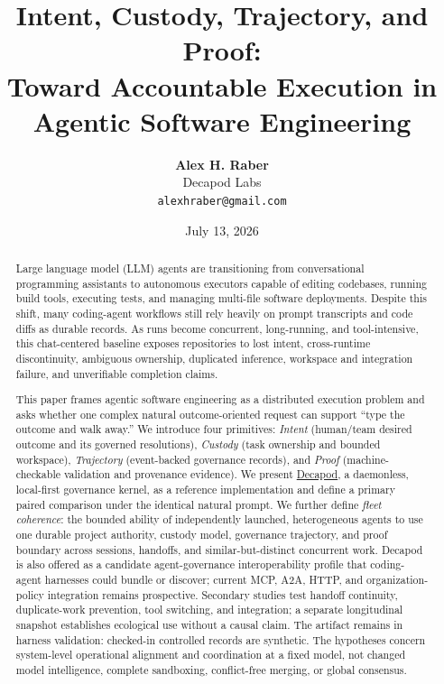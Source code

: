 \documentclass[11pt,a4paper]{article}
\title{\Huge\sffamily\bfseries Intent, Custody, Trajectory, and Proof:\\\Large Toward Accountable Execution in Agentic Software Engineering}
\author{\textbf{Alex H. Raber}\\[0.5em]
\sffamily Decapod Labs\\[0.2em]
\texttt{alexhraber@gmail.com}
}
\date{\sffamily July 13, 2026}
\begin{document}
\maketitle

\begin{abstract}
\noindent Large language model (LLM) agents are transitioning from conversational programming assistants to autonomous executors capable of editing codebases, running build tools, executing tests, and managing multi-file software deployments. Despite this shift, many coding-agent workflows still rely heavily on prompt transcripts and code diffs as durable records. As runs become concurrent, long-running, and tool-intensive, this chat-centered baseline exposes repositories to lost intent, cross-runtime discontinuity, ambiguous ownership, duplicated inference, workspace and integration failure, and unverifiable completion claims.

\medskip
\noindent This paper frames agentic software engineering as a distributed execution problem and asks whether one complex natural outcome-oriented request can support ``type the outcome and walk away.'' We introduce four primitives: \emph{Intent} (human/team desired outcome and its governed resolutions), \emph{Custody} (task ownership and bounded workspace), \emph{Trajectory} (event-backed governance records), and \emph{Proof} (machine-checkable validation and provenance evidence). We present \href{https://github.com/DecapodLabs/decapod}{Decapod}, a daemonless, local-first governance kernel, as a reference implementation and define a primary paired comparison under the identical natural prompt. We further define \emph{fleet coherence}: the bounded ability of independently launched, heterogeneous agents to use one durable project authority, custody model, governance trajectory, and proof boundary across sessions, handoffs, and similar-but-distinct concurrent work. Decapod is also offered as a candidate agent-governance interoperability profile that coding-agent harnesses could bundle or discover; current MCP, A2A, HTTP, and organization-policy integration remains prospective. Secondary studies test handoff continuity, duplicate-work prevention, tool switching, and integration; a separate longitudinal snapshot establishes ecological use without a causal claim. The artifact remains in harness validation: checked-in controlled records are synthetic. The hypotheses concern system-level operational alignment and coordination at a fixed model, not changed model intelligence, complete sandboxing, conflict-free merging, or global consensus.
\end{abstract}

\vspace{1.5em}















\end{document}

